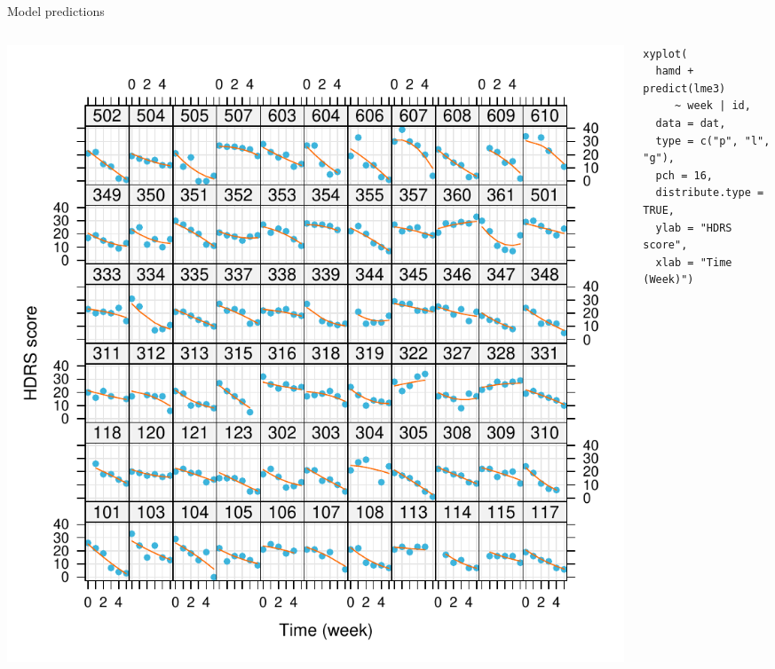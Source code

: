 \documentclass[aspectratio=169]{beamer}
\begin{document}
\begin{frame}[fragile]{Model predictions}
  \begin{columns}
    \begin{column}{8cm}
      \includegraphics[scale=.5]{../figures/hdrs-ind_pred-quad}
    \end{column}
    \begin{column}{6cm}
      \begin{lstlisting}
xyplot(
  hamd + predict(lme3)
     ~ week | id,
  data = dat,
  type = c("p", "l", "g"),
  pch = 16,
  distribute.type = TRUE,
  ylab = "HDRS score",
  xlab = "Time (Week)")
      \end{lstlisting}
    \end{column}
  \end{columns}
\end{frame}
\end{document}
